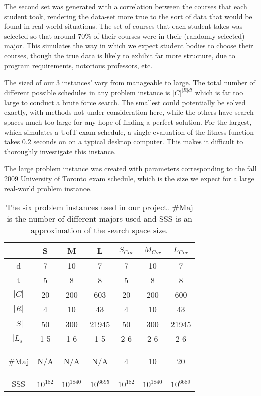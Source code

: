 \documentclass[letterpaper]{article}
\begin{document}
    The second set was generated with a correlation between the courses that each 
    student took, rendering the data-set more true to the sort of data that would 
    be found in real-world situations. The set of courses that each student takes 
    was selected so that around 70\% of their courses were in their (randomly selected) 
    major. This simulates the way in which we expect student bodies to choose their 
    courses, though the true data is likely to exhibit far more structure, due to 
    program requirements, notorious professors, etc.
      
    The sized of our 3 instances' vary from manageable to large. The total number 
    of different possible schedules in any problem instance is $|C|^{|R|dt}$ which 
    is far too large to conduct a brute force search. The smallest could potentially 
    be solved exactly, with methods not under consideration here, while the others 
    have search spaces much too large for any hope of finding a perfect solution. 
    For the largest, which simulates a UofT exam schedule, a single evaluation of 
    the fitness function takes 0.2 seconds on on a typical desktop computer. This 
    makes it difficult to thoroughly investigate this instance.
    
    The large problem instance was created with parameters corresponding to the fall 2009 
	University of Toronto exam schedule, which is the size we expect for a large 
	real-world problem instance.
	
    \begin{table}[h]
    \begin{small}
    \begin{tabular}{*{7}{c}}
    \hline 
 	  	& S 	& M 	& L 	& $S_{Cor}$ & $M_{Cor}$ & $L_{Cor}$ \\ 
    \hline \hline
     d 		& 7 	& 10	& 7 	& 7 	& 10 	& 7 	\\ 
     t 		& 5		& 8 	& 8 	& 5 	& 8 	& 8 	\\ 
     $|C|$	& 20 	& 200 	& 603 	& 20 	& 200 	& 600 	\\ 
     $|R|$	& 4 	& 10 	& 43 	& 4 	& 10 	& 43	\\ 
     $|S|$	& 50 	& 300 	& 21945 & 50 	& 300 	& 21945	\\ 
     $|L_s|$	& 1-5 	& 1-6 	& 1-5 	& 2-6 	& 2-6 	& 2-6 	\\ 
     \begin{tiny}$\#$Maj\end{tiny}	& N/A 	& N/A 	& N/A 	& 4 	& 10 	& 20 	\\ 
     \textsc{SSS}	& $10^{182}$ & $10^{1840}$ & $10^{6695}$ & $10^{182}$ & $10^{1840}$ & $10^{6689}$ \\
    \hline  
    \end{tabular} 
	\end{small}
	\caption{The six problem instances used in our project. $\#$Maj is the number of different 
	         majors used and \textsc{SSS} is an approximation of the search space size.}
	\end{table}
	
\end{document}
